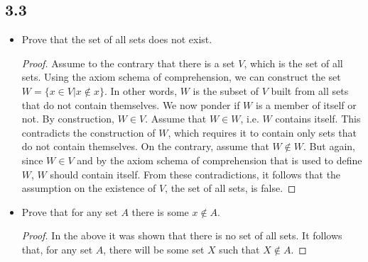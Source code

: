 \subsection*{3.3}

\begin{itemize}
    \item Prove that the set of all sets does not exist.
    
    \begin{proof}
    Assume to the contrary that there is a set $V$, which is the set of all sets. Using the axiom schema of comprehension, we can construct the set $W = \{x \in V | x \notin x\}$. In other words, $W$ is the subset of $V$ built from all sets that do not contain themselves. We now ponder if $W$ is a member of itself or not. By construction, $W \in V$. Assume that $W \in W$, i.e. $W$ contains itself. This contradicts the construction of $W$, which requires it to contain only sets that do not contain themselves. On the contrary, assume that $W \notin W$. But again, since $W \in V$ and by the axiom schema of comprehension that is used to define $W$, $W$ should contain itself. From these contradictions, it follows that the assumption on the existence of $V$, the set of all sets, is false.
    \end{proof}
    
    \item Prove that for any set $A$ there is some $x \notin A$.
    
    \begin{proof}
    In the above it was shown that there is no set of all sets. It follows that, for any set $A$, there will be some set $X$ such that $X \notin A$. 
    \end{proof}
    
\end{itemize}

